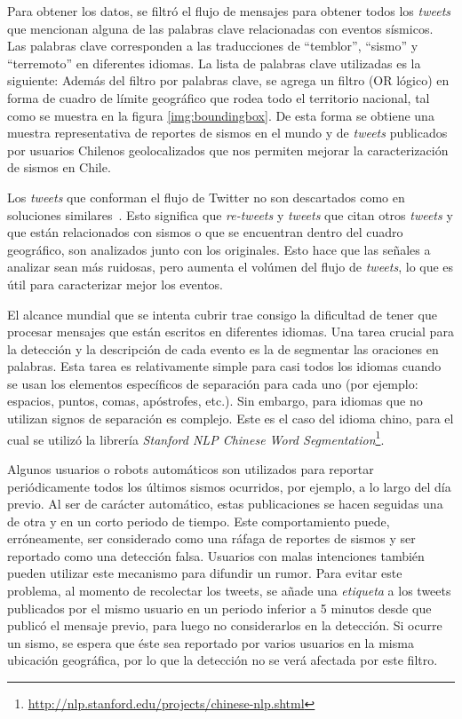 Para obtener los datos, se filtró el flujo de mensajes para obtener todos los \textit{tweets} que mencionan alguna de las palabras clave relacionadas con eventos sísmicos. 
%
Las palabras clave corresponden a las traducciones de ``temblor'', ``sismo'' y ``terremoto'' en diferentes idiomas. 
%
La lista de palabras clave utilizadas es la siguiente: 
%
Además del filtro por palabras clave, se agrega un filtro (OR lógico) en forma de cuadro de límite geográfico que rodea todo el territorio nacional, tal como se muestra en la figura \ref{img:boundingbox}.
%
De esta forma se obtiene una muestra representativa de reportes de sismos en el mundo y de \textit{tweets} publicados por usuarios Chilenos geolocalizados que nos permiten mejorar la caracterización de sismos en Chile.


Los \textit{tweets} que conforman el flujo de Twitter no son descartados como en soluciones similares~\cite{avvenuti2014ears}. 
%
Esto significa que \textit{re-tweets} y \textit{tweets} que citan otros \textit{tweets} y que están relacionados con sismos o que se encuentran dentro del cuadro geográfico, son analizados junto con los originales. 
%
Esto hace que las señales a analizar sean más ruidosas, pero aumenta el volúmen del flujo de \textit{tweets}, lo que es útil para caracterizar mejor los eventos. 


El alcance mundial que se intenta cubrir trae consigo la dificultad de tener que procesar mensajes que están escritos en diferentes idiomas. 
%
Una tarea crucial para la detección y la descripción de cada evento es la de segmentar las oraciones en palabras.
%
Esta tarea es relativamente simple para casi todos los idiomas cuando se usan los elementos específicos de separación para cada uno (por ejemplo: espacios, puntos, comas, apóstrofes, etc.).
% 
Sin embargo, para idiomas que no utilizan signos de separación es complejo. 
%
Este es el caso del idioma chino, para el cual se utilizó la librería {\em Stanford NLP Chinese Word Segmentation}\footnote{\url{http://nlp.stanford.edu/projects/chinese-nlp.shtml}}.


Algunos usuarios o robots automáticos son utilizados para reportar periódicamente todos los últimos sismos ocurridos, por ejemplo, a lo largo del día previo. 
%
Al ser de carácter automático, estas publicaciones se hacen seguidas una de otra y en un corto periodo de tiempo. 
%
Este comportamiento puede, erróneamente, ser considerado como una ráfaga de reportes de sismos y ser reportado como una detección falsa.  
%
Usuarios con malas intenciones también pueden utilizar este mecanismo para difundir un rumor. 
%
Para evitar este problema, al momento de recolectar los tweets, se añade una \textit{etiqueta} a los tweets publicados por el mismo usuario en un periodo inferior a 5 minutos desde que publicó el mensaje previo, para luego no considerarlos en la detección. 
%
Si ocurre un sismo, se espera que éste sea reportado por varios usuarios en la misma ubicación geográfica, por lo que la detección no se verá afectada por este filtro. 


